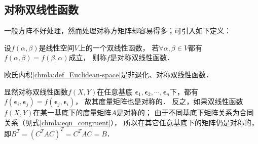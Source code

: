 \subsection{对称双线性函数}\label{chmla:sec_sbf}
一般方阵不好处理，然而处理对称方矩阵却容易得多；可引入如下定义：
\begin{definition}
    设$f(\alpha,\beta)$是线性空间$V$上的一个双线性函数，
    若$\forall \alpha,\beta \in V$都有$f(\alpha,\beta)=f(\beta,\alpha)$成立，
    则称$f$是{\heiti 对称双线性函数}． 
\end{definition}
\begin{example}
    欧氏内积\ref{chmla:def_Euclidean-space}是非退化、对称双线性函数．
\end{example}



显然对称双线性函数$f(X,Y)$在任意基底
$\boldsymbol{\epsilon}_1,\boldsymbol{\epsilon}_2,\cdots,\boldsymbol{\epsilon}_n$下，都有
$f(\boldsymbol{\epsilon}_i,\boldsymbol{\epsilon}_j)=
f(\boldsymbol{\epsilon}_j,\boldsymbol{\epsilon}_i)$，
故其度量矩阵也是对称的．
反之，如果双线性函数$f(X,Y)$在某一基底下的度量矩阵$A$是对称的；
由于不同基底下矩阵关系为合同关系（见式\eqref{chmla:eqn_congruent}），
所以在其它任意基底下的矩阵仍是对称的，
即$B^T=(C^T A C)^T = C^T A C=B$．

